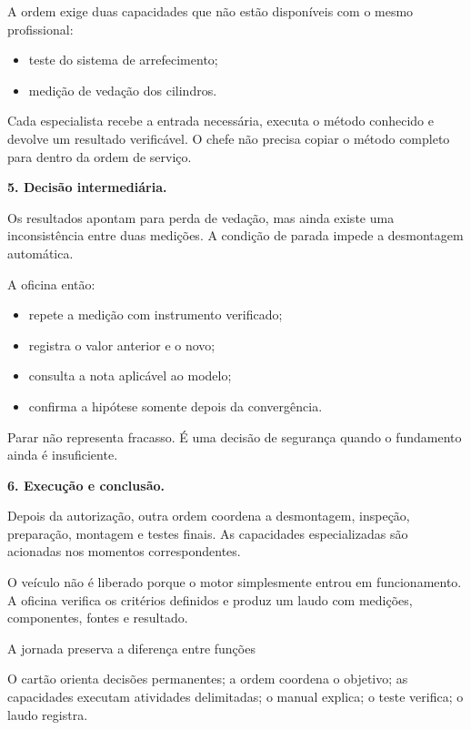 \documentclass[
  10pt,
  a4paper,
  oneside]{book}
\providecommand{\tightlist}{%
  \setlength{\itemsep}{0pt}\setlength{\parskip}{0pt}}
\begin{document}
A ordem exige duas capacidades que não estão disponíveis com o mesmo
profissional:

\begin{itemize}
\tightlist
\item
  teste do sistema de arrefecimento;
\item
  medição de vedação dos cilindros.
\end{itemize}

Cada especialista recebe a entrada necessária, executa o método
conhecido e devolve um resultado verificável. O chefe não precisa copiar
o método completo para dentro da ordem de serviço.

\textbf{5. Decisão intermediária.}

Os resultados apontam para perda de vedação, mas ainda existe uma
inconsistência entre duas medições. A condição de parada impede a
desmontagem automática.

A oficina então:

\begin{itemize}
\tightlist
\item
  repete a medição com instrumento verificado;
\item
  registra o valor anterior e o novo;
\item
  consulta a nota aplicável ao modelo;
\item
  confirma a hipótese somente depois da convergência.
\end{itemize}

Parar não representa fracasso. É uma decisão de segurança quando o
fundamento ainda é insuficiente.

\textbf{6. Execução e conclusão.}

Depois da autorização, outra ordem coordena a desmontagem, inspeção,
preparação, montagem e testes finais. As capacidades especializadas são
acionadas nos momentos correspondentes.

O veículo não é liberado porque o motor simplesmente entrou em
funcionamento. A oficina verifica os critérios definidos e produz um
laudo com medições, componentes, fontes e resultado.

\begin{tipbox}{A jornada preserva a diferença entre funções}

O cartão orienta decisões permanentes; a ordem coordena o objetivo; as
capacidades executam atividades delimitadas; o manual explica; o teste
verifica; o laudo registra.

\end{tipbox}
\end{document}
